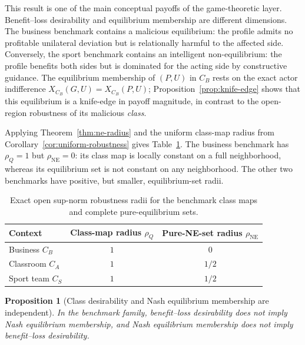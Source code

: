 \documentclass[a4paper,fleqn]{cas-dc}
\newtheorem{proposition}[definition]{Proposition}
\theoremstyle{remark}
\newcommand{\NE}{\operatorname{NE}}
\begin{document}
This result is one of the main conceptual payoffs of the game-theoretic layer. Benefit--loss desirability and equilibrium membership are different dimensions. The business benchmark contains a malicious equilibrium: the profile admits no profitable unilateral deviation but is relationally harmful to the affected side. Conversely, the sport benchmark contains an intelligent non-equilibrium: the profile benefits both sides but is dominated for the acting side by constructive guidance. The equilibrium membership of $(P,U)$ in $C_B$ rests on the exact actor indifference $X_{C_B}(G,U)=X_{C_B}(P,U)$; Proposition~\ref{prop:knife-edge} shows that this equilibrium is a knife-edge in payoff magnitude, in contrast to the open-region robustness of its malicious \emph{class}.

Applying Theorem~\ref{thm:ne-radius} and the uniform class-map radius from Corollary~\ref{cor:uniform-robustness} gives Table~\ref{tab:robustness-radii}. The business benchmark has $\rho_Q=1$ but $\rho_{\NE}=0$: its class map is locally constant on a full neighborhood, whereas its equilibrium set is not constant on any neighborhood. The other two benchmarks have positive, but smaller, equilibrium-set radii.

\begin{table}[t]
\centering
\small
\begin{tabular}{lcc}
\toprule
Context & Class-map radius $\rho_Q$ & Pure-NE-set radius $\rho_{\NE}$\\
\midrule
Business $C_B$ & $1$ & $0$\\
Classroom $C_A$ & $1$ & $1/2$\\
Sport team $C_S$ & $1$ & $1/2$\\
\bottomrule
\end{tabular}
\caption{Exact open sup-norm robustness radii for the benchmark class maps and complete pure-equilibrium sets.}
\label{tab:robustness-radii}
\end{table}

\begin{proposition}[Class desirability and Nash equilibrium membership are independent]
\label{prop:class-nash-independent}
In the benchmark family, benefit--loss desirability does not imply Nash equilibrium membership, and Nash equilibrium membership does not imply benefit--loss desirability.
\end{proposition}
\end{document}
